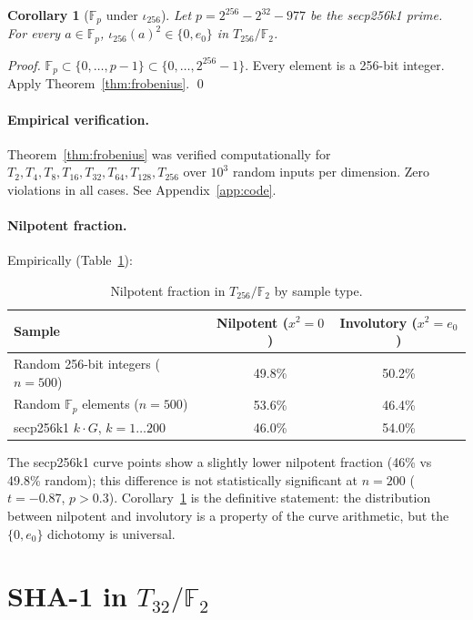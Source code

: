 \documentclass[runningheads]{llncs}
\theoremstyle{plain}
\newtheorem{corollary}[theorem]{Corollary}
\theoremstyle{definition}
\newcommand{\GFtwo}{\mathbb{F}_2}
\newcommand{\Fp}{\mathbb{F}_p}
\begin{document}
\begin{corollary}[$\Fp$ under $\iota_{256}$]
\label{cor:fp}
Let $p = 2^{256} - 2^{32} - 977$ be the secp256k1 prime. For every $a \in \Fp$,
$\iota_{256}(a)^2 \in \{0, e_0\}$ in $T_{256}/\GFtwo$.
\end{corollary}

\begin{proof}
$\Fp \subset \{0, \ldots, p-1\} \subset \{0, \ldots, 2^{256}-1\}$.
Every element is a 256-bit integer. Apply Theorem~\ref{thm:frobenius}. \qed
\end{proof}

\paragraph{Empirical verification.}
Theorem~\ref{thm:frobenius} was verified computationally for
$T_2, T_4, T_8, T_{16}, T_{32}, T_{64}, T_{128}, T_{256}$
over $10^3$ random inputs per dimension. Zero violations in all cases.
See Appendix~\ref{app:code}.

\paragraph{Nilpotent fraction.}
Empirically (Table~\ref{tab:nilp}):

\begin{table}[h]
\centering
\caption{Nilpotent fraction in $T_{256}/\GFtwo$ by sample type.}
\label{tab:nilp}
\begin{tabular}{lcc}
\toprule
Sample & Nilpotent ($x^2=0$) & Involutory ($x^2=e_0$) \\
\midrule
Random 256-bit integers ($n=500$) & 49.8\% & 50.2\% \\
Random $\Fp$ elements ($n=500$) & 53.6\% & 46.4\% \\
secp256k1 $k \cdot G$, $k=1\ldots 200$ & 46.0\% & 54.0\% \\
\bottomrule
\end{tabular}
\end{table}

The secp256k1 curve points show a slightly lower nilpotent fraction
(46\% vs 49.8\% random); this difference is not statistically significant
at $n=200$ ($t = -0.87$, $p > 0.3$). Corollary~\ref{cor:fp} is the definitive
statement: the distribution between nilpotent and involutory is a property
of the curve arithmetic, but the $\{0, e_0\}$ dichotomy is universal.


\section{SHA-1 in $T_{32}/\GFtwo$}
\label{sec:sha1}
\end{document}
